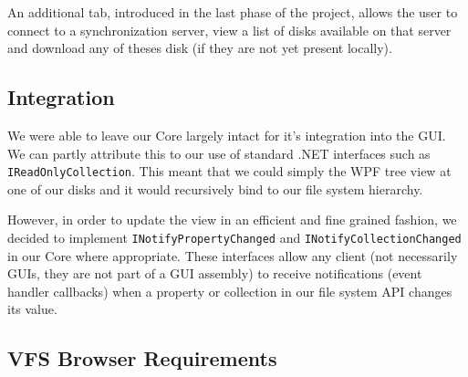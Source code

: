\documentclass[a4paper,12pt]{article}
\begin{document}
An additional tab, introduced in the last phase of the project, allows the user to connect to a synchronization server, view a list of disks available on that server and download any of theses disk (if they are not yet present locally).

\subsection{Integration}
We were able to leave our Core largely intact for it's integration into the GUI. 
We can partly attribute this to our use of standard .NET interfaces such as \lstinline!IReadOnlyCollection!. 
This meant that we could simply the WPF tree view at one of our disks and it would recursively bind to our file system hierarchy.

However, in order to update the view in an efficient and fine grained fashion, we decided to implement \lstinline!INotifyPropertyChanged! and \lstinline!INotifyCollectionChanged! in our Core where appropriate.
These interfaces allow any client (not necessarily GUIs, they are not part of a GUI assembly) to receive notifications (event handler callbacks) when a property or collection in our file system API changes its value.


\subsection{VFS Browser Requirements}

\end{document}
